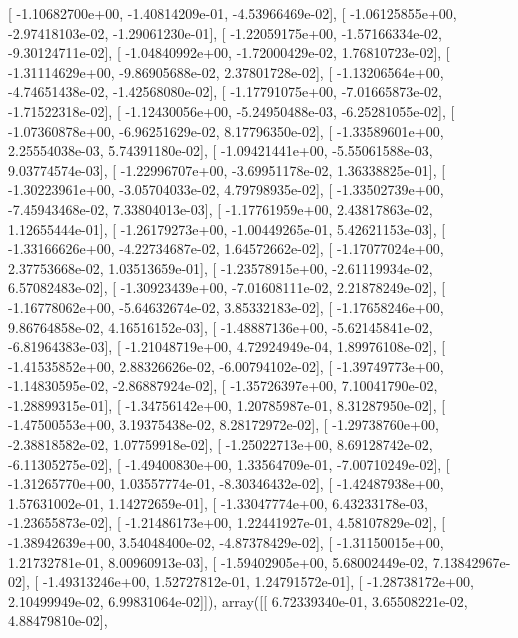\documentclass{article}
\begin{document}
       [ -1.10682700e+00,  -1.40814209e-01,  -4.53966469e-02],
       [ -1.06125855e+00,  -2.97418103e-02,  -1.29061230e-01],
       [ -1.22059175e+00,  -1.57166334e-02,  -9.30124711e-02],
       [ -1.04840992e+00,  -1.72000429e-02,   1.76810723e-02],
       [ -1.31114629e+00,  -9.86905688e-02,   2.37801728e-02],
       [ -1.13206564e+00,  -4.74651438e-02,  -1.42568080e-02],
       [ -1.17791075e+00,  -7.01665873e-02,  -1.71522318e-02],
       [ -1.12430056e+00,  -5.24950488e-03,  -6.25281055e-02],
       [ -1.07360878e+00,  -6.96251629e-02,   8.17796350e-02],
       [ -1.33589601e+00,   2.25554038e-03,   5.74391180e-02],
       [ -1.09421441e+00,  -5.55061588e-03,   9.03774574e-03],
       [ -1.22996707e+00,  -3.69951178e-02,   1.36338825e-01],
       [ -1.30223961e+00,  -3.05704033e-02,   4.79798935e-02],
       [ -1.33502739e+00,  -7.45943468e-02,   7.33804013e-03],
       [ -1.17761959e+00,   2.43817863e-02,   1.12655444e-01],
       [ -1.26179273e+00,  -1.00449265e-01,   5.42621153e-03],
       [ -1.33166626e+00,  -4.22734687e-02,   1.64572662e-02],
       [ -1.17077024e+00,   2.37753668e-02,   1.03513659e-01],
       [ -1.23578915e+00,  -2.61119934e-02,   6.57082483e-02],
       [ -1.30923439e+00,  -7.01608111e-02,   2.21878249e-02],
       [ -1.16778062e+00,  -5.64632674e-02,   3.85332183e-02],
       [ -1.17658246e+00,   9.86764858e-02,   4.16516152e-03],
       [ -1.48887136e+00,  -5.62145841e-02,  -6.81964383e-03],
       [ -1.21048719e+00,   4.72924949e-04,   1.89976108e-02],
       [ -1.41535852e+00,   2.88326626e-02,  -6.00794102e-02],
       [ -1.39749773e+00,  -1.14830595e-02,  -2.86887924e-02],
       [ -1.35726397e+00,   7.10041790e-02,  -1.28899315e-01],
       [ -1.34756142e+00,   1.20785987e-01,   8.31287950e-02],
       [ -1.47500553e+00,   3.19375438e-02,   8.28172972e-02],
       [ -1.29738760e+00,  -2.38818582e-02,   1.07759918e-02],
       [ -1.25022713e+00,   8.69128742e-02,  -6.11305275e-02],
       [ -1.49400830e+00,   1.33564709e-01,  -7.00710249e-02],
       [ -1.31265770e+00,   1.03557774e-01,  -8.30346432e-02],
       [ -1.42487938e+00,   1.57631002e-01,   1.14272659e-01],
       [ -1.33047774e+00,   6.43233178e-03,  -1.23655873e-02],
       [ -1.21486173e+00,   1.22441927e-01,   4.58107829e-02],
       [ -1.38942639e+00,   3.54048400e-02,  -4.87378429e-02],
       [ -1.31150015e+00,   1.21732781e-01,   8.00960913e-03],
       [ -1.59402905e+00,   5.68002449e-02,   7.13842967e-02],
       [ -1.49313246e+00,   1.52727812e-01,   1.24791572e-01],
       [ -1.28738172e+00,   2.10499949e-02,   6.99831064e-02]]), array([[  6.72339340e-01,   3.65508221e-02,   4.88479810e-02],
\end{document}
